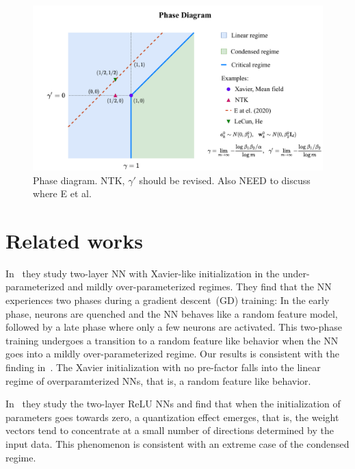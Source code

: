 \documentclass{article}
\begin{document}
\begin{figure}
    \centering
    \includegraphics[width=\textwidth]{pic/fig-phase-diagram}
    \caption{Phase diagram. NTK, $\gamma'$ should be revised. Also NEED to discuss where E et al.}
    \label{fig:phase-diagram}
\end{figure}

\section{Related works}
In~\cite{ma2020quenching} they study two-layer NN with Xavier-like initialization in the under-parameterized and mildly over-parameterized regimes. They find that the NN experiences two phases during a gradient descent~(GD) training: In the early phase, neurons are quenched and the NN behaves like a random feature model, followed by a late phase where only a few neurons are activated. This two-phase training undergoes a transition to a random feature like behavior when the NN goes into a mildly over-parameterized regime.  Our results is consistent with the finding in~\cite{ma2020quenching}. The Xavier initialization with no pre-factor falls into the linear regime of overparamterized NNs, that is, a random feature like behavior.

In~\cite{maennel2018gradient} they study the two-layer ReLU NNs and find that when the initialization of parameters goes towards zero, a quantization effect emerges, that is, the weight vectors tend to concentrate at a small number of directions determined by the input data. This phenomenon is consistent with an extreme case of the condensed regime.
\end{document}
